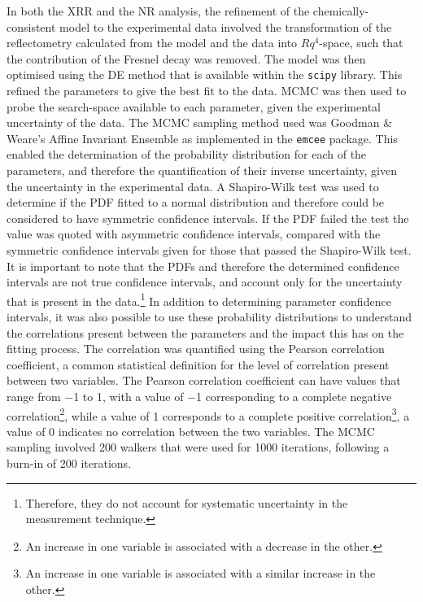 In both the XRR and the NR analysis, the refinement of the chemically-consistent model to the experimental data involved the transformation of the reflectometry calculated from the model and the data into $Rq^4$-space, such that the contribution of the Fresnel decay was removed.\autocite{gerelli_aurore_2016}
The model was then optimised using the DE method that is available within the \texttt{scipy} library.\autocite{jones_scipy_nodate}
This refined the parameters to give the best fit to the data.
MCMC was then used to probe the search-space available to each parameter, given the experimental uncertainty of the data.
The MCMC sampling method used was Goodman \& Weare's Affine Invariant Ensemble\autocite{goodman_ensemble_2010} as implemented in the \texttt{emcee} package.\autocite{foreman-mackey_emcee_2013}
This enabled the determination of the probability distribution for each of the parameters, and therefore the quantification of their inverse uncertainty, given the uncertainty in the experimental data.
A Shapiro-Wilk test\autocite[this is a common test to assess the normality of a distribution]{shapiro_analysis_1965} was used to determine if the PDF fitted to a normal distribution and therefore could be considered to have symmetric confidence intervals.
If the PDF failed the test the value was quoted with asymmetric confidence intervals, compared with the symmetric confidence intervals given for those that passed the Shapiro-Wilk test.
It is important to note that the PDFs and therefore the determined confidence intervals are not true confidence intervals, and account only for the uncertainty that is present in the data.\footnote{Therefore, they do not account for systematic uncertainty in the measurement technique.}
In addition to determining parameter confidence intervals, it was also possible to use these probability distributions to understand the correlations present between the parameters and the impact this has on the fitting process.
The correlation was quantified using the Pearson correlation coefficient\autocite{pearson_notes_1895}, a common statistical definition for the level of correlation present between two variables.
The Pearson correlation coefficient can have values that range from \num{-1} to \num{1}, with a value of \num{-1} corresponding to a complete negative correlation\footnote{An increase in one variable is associated with a decrease in the other.}, while a value of \num{1} corresponds to a complete positive correlation\footnote{An increase in one variable is associated with a similar increase in the other.}, a value of \num{0} indicates no correlation between the two variables.
The MCMC sampling involved 200 walkers that were used for 1000 iterations, following a burn-in of 200 iterations.
